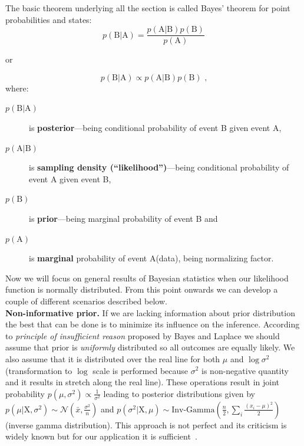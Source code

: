 \documentclass[12pt, a4paper, pdflatex, leqno]{report}
\begin{document}
The basic theorem underlying all the section is called Bayes' theorem for point probabilities and states:
$$
p \left( \mathrm{B} | \mathrm{A} \right) = \frac{  p \left( \mathrm{A} | \mathrm{B} \right) p \left( \mathrm{B} \right) }{ p \left( \mathrm{A} \right) }
$$
\begin{center}
or
\end{center}
$$
p \left( \mathrm{B} | \mathrm{A} \right) \propto p \left( \mathrm{A} | \mathrm{B} \right) p \left( \mathrm{B} \right) \text{ ,}
$$
where:
\begin{description}
\item[$p \left( \mathrm{B} | \mathrm{A} \right)$] is \textbf{posterior}---being conditional probability of event \textrm{B} given event \textrm{A},
\item[$p \left( \mathrm{A} | \mathrm{B} \right)$] is \textbf{sampling density (``likelihood'')}---being conditional probability of event \textrm{A} given event \textrm{B},
\item[$p \left( \mathrm{B} \right)$] is \textbf{prior}---being marginal probability of event \textrm{B} and
\item[$p \left( \mathrm{A} \right)$] is \textbf{marginal} probability of event \textrm{A}(data), being normalizing factor.
\end{description}

Now we will focus on general results of Bayesian statistics when our likelihood function is normally distributed. From this point onwards we can develop a couple of different scenarios described below.\\[2cm]

\textbf{\textrm{Non-informative prior. }}If we are lacking information about prior distribution the best that can be done is to minimize its influence on the inference. According to \emph{principle of insufficient reason} proposed by Bayes and Laplace we should assume that prior is \emph{uniformly} distributed so all outcomes are equally likely. We also assume that it is distributed over the real line for both $\mu$ and $\log \sigma^2$(transformation to $\log$ scale is performed because $\sigma^2$ is non-negative quantity and it results in stretch along the real line). These operations result in joint probability $p \left( \mu, \sigma^2 \right) \propto \frac{1}{\sigma^2} $ leading to posterior distributions given by $p \left( \mu | \mathrm{X}, \sigma^2 \right) \sim \mathcal{N} \left( \bar{x}, \frac{\sigma^2}{n} \right) $ and $p \left( \sigma^2 | \mathrm{X}, \mu \right) \sim \mathrm{Inv}\text{-}\mathrm{Gamma} \left( \frac{n}{2} , \sum_{i} \frac{\left( x_i - \mu \right)^2}{2}  \right) $(inverse gamma distribution). This approach is not perfect and its criticism is widely known but for our application it is sufficient~\citep{Syversveen98noninformativebayesian}.\\
\end{document}
